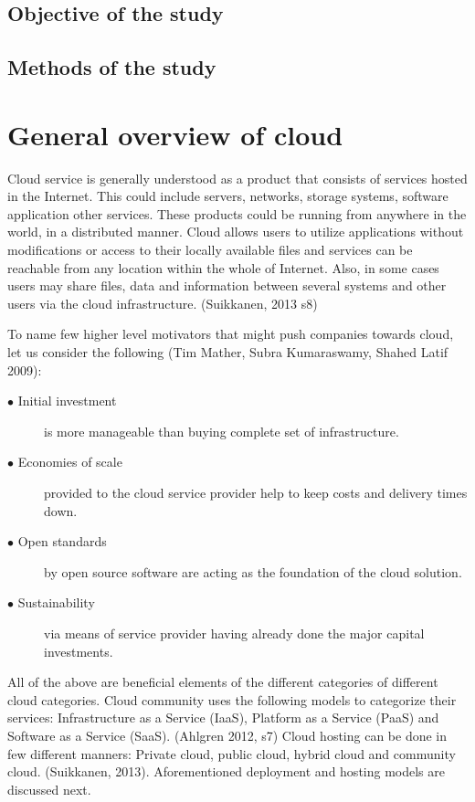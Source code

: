 \documentclass{article}
\begin{document}
\subsection{Objective of the study}
\subsection{Methods of the study}
\section{General overview of cloud}
Cloud service is generally understood as a product that consists of services hosted in the Internet. This could include servers, networks, storage systems, software application other services. These products could be running from anywhere in the world, in a distributed manner. Cloud allows users to utilize applications without modifications or access to their locally available files and services can be reachable from any location within the whole of Internet. Also, in some cases users may share files, data and information between several systems and other users via the cloud infrastructure.
(Suikkanen, 2013 s8)
\par
To name few higher level motivators that might push companies towards cloud, let us consider the following (Tim Mather, Subra Kumaraswamy, Shahed Latif 2009):
\begin{description}
        \item[$\bullet$ Initial investment] is more manageable than buying complete set of infrastructure.
        \item[$\bullet$ Economies of scale] provided to the cloud service provider help to keep costs and delivery times down.
        \item[$\bullet$ Open standards] by open source software are acting as the foundation of the cloud solution.
        \item[$\bullet$ Sustainability] via means of service provider having already done the major capital investments.
\end{description}
All of the above are beneficial elements of the different categories of different cloud categories.
Cloud community uses the following models to categorize their services: Infrastructure as a Service (IaaS), Platform as a Service (PaaS) and Software as a Service (SaaS). (Ahlgren 2012, s7)
Cloud hosting can be done in few different manners: Private cloud, public cloud, hybrid cloud and community cloud. (Suikkanen, 2013).
Aforementioned deployment and hosting models are discussed next.
\end{document}
